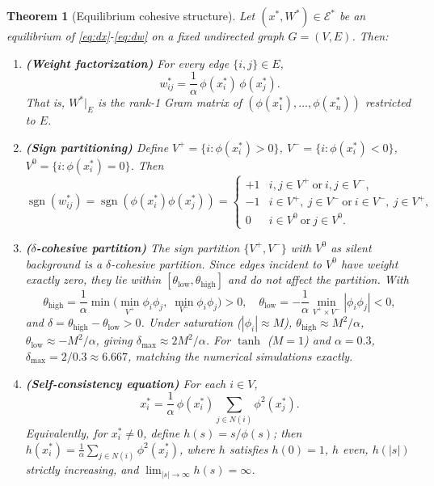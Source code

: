 \documentclass[3p]{elsarticle}
\newtheorem{theorem}{Theorem}
\newcommand{\E}{\mathcal{E}}
\DeclareMathOperator{\sign}{sgn}
\begin{document}
\begin{theorem}[Equilibrium cohesive structure] \label{thm:3}
  Let $(x^*,W^*)\in\E^*$ be an equilibrium of \eqref{eq:dx}-\eqref{eq:dw} on a fixed undirected graph $G=(V,E)$. Then:
  \begin{enumerate}[label=\textbf{Part \Alph*.}, ref=Part \Alph*]
  \item \textbf{(Weight factorization)} For every edge $\{i,j\}\in E$,
    \begin{equation}
    w_{ij}^* = \frac{1}{\alpha}\,\phi(x_i^*)\,\phi(x_j^*). \label{eq:factor}
    \end{equation}
    That is, $W^*|_E$ is the rank-1 Gram matrix of $(\phi(x_1^*),\dots,\phi(x_n^*))$ restricted to $E$.

  \item \textbf{(Sign partitioning)} Define $V^+=\{i: \phi(x_i^*)>0\}$, $V^-=\{i: \phi(x_i^*)<0\}$, $V^0=\{i: \phi(x_i^*)=0\}$. Then
    \[
    \sign(w_{ij}^*) = \sign(\phi(x_i^*)\phi(x_j^*)) =
    \begin{cases}
      +1 & i,j\in V^+\ \text{or}\ i,j\in V^-,\\
      -1 & i\in V^+,\ j\in V^-\ \text{or}\ i\in V^-,\ j\in V^+,\\
      0  & i\in V^0\ \text{or}\ j\in V^0.
    \end{cases}
    \]

  \item \textbf{($\delta$-cohesive partition)} The sign partition $\{V^+,V^-\}$ with $V^0$ as silent background is a $\delta$-cohesive partition. Since edges incident to $V^0$ have weight exactly zero, they lie within $[\theta_{\text{low}},\theta_{\text{high}}]$ and do not affect the partition. With
    \[
    \theta_{\text{high}} = \frac{1}{\alpha}\min\bigl(\min_{V^+}\phi_i\phi_j,\; \min_{V^-}\phi_i\phi_j\bigr) > 0,\quad
    \theta_{\text{low}} = -\frac{1}{\alpha}\min_{V^+\times V^-}|\phi_i\phi_j| < 0,
    \]
    and $\delta = \theta_{\text{high}} - \theta_{\text{low}} > 0$. Under saturation ($|\phi_i|\approx M$), $\theta_{\text{high}}\approx M^2/\alpha$, $\theta_{\text{low}}\approx -M^2/\alpha$, giving $\delta_{\max} \approx 2M^2/\alpha$. For $\tanh$ ($M=1$) and $\alpha=0.3$, $\delta_{\max}= 2/0.3 \approx 6.667$, matching the numerical simulations exactly.

  \item \textbf{(Self-consistency equation)} For each $i\in V$,
    \begin{equation}
    x_i^* = \frac{1}{\alpha}\,\phi(x_i^*)\sum_{j\in N(i)} \phi^2(x_j^*). \label{eq:sc}
    \end{equation}
    Equivalently, for $x_i^*\neq 0$, define $h(s)=s/\phi(s)$; then $h(x_i^*) = \frac{1}{\alpha}\sum_{j\in N(i)}\phi^2(x_j^*)$, where $h$ satisfies $h(0)=1$, $h$ even, $h(|s|)$ strictly increasing, and $\lim_{|s|\to\infty}h(s)=\infty$.
  \end{enumerate}
\end{theorem}
\end{document}
